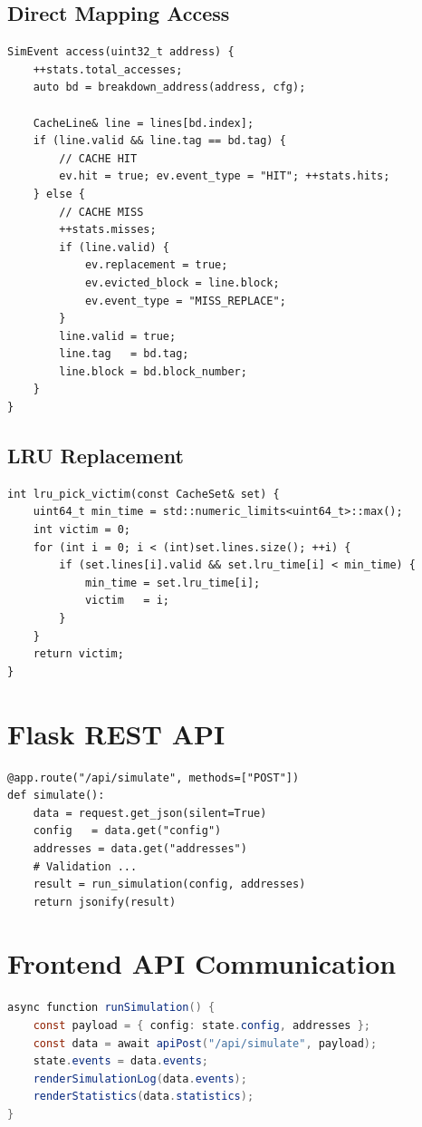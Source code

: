 \documentclass[12pt,a4paper]{report}
\begin{document}
\subsection{Direct Mapping Access}
\begin{lstlisting}[style=cppstyle, caption=Direct mapping hit/miss detection]
SimEvent access(uint32_t address) {
    ++stats.total_accesses;
    auto bd = breakdown_address(address, cfg);

    CacheLine& line = lines[bd.index];
    if (line.valid && line.tag == bd.tag) {
        // CACHE HIT
        ev.hit = true; ev.event_type = "HIT"; ++stats.hits;
    } else {
        // CACHE MISS
        ++stats.misses;
        if (line.valid) {
            ev.replacement = true;
            ev.evicted_block = line.block;
            ev.event_type = "MISS_REPLACE";
        }
        line.valid = true;
        line.tag   = bd.tag;
        line.block = bd.block_number;
    }
}
\end{lstlisting}

\subsection{LRU Replacement}
\begin{lstlisting}[style=cppstyle, caption=LRU victim selection]
int lru_pick_victim(const CacheSet& set) {
    uint64_t min_time = std::numeric_limits<uint64_t>::max();
    int victim = 0;
    for (int i = 0; i < (int)set.lines.size(); ++i) {
        if (set.lines[i].valid && set.lru_time[i] < min_time) {
            min_time = set.lru_time[i];
            victim   = i;
        }
    }
    return victim;
}
\end{lstlisting}

\section{Flask REST API}
\begin{lstlisting}[style=pystyle, caption=Simulate endpoint (app.py)]
@app.route("/api/simulate", methods=["POST"])
def simulate():
    data = request.get_json(silent=True)
    config   = data.get("config")
    addresses = data.get("addresses")
    # Validation ...
    result = run_simulation(config, addresses)
    return jsonify(result)
\end{lstlisting}

\section{Frontend API Communication}
\begin{lstlisting}[language=Java, caption=JavaScript simulation call (simulator.js)]
async function runSimulation() {
    const payload = { config: state.config, addresses };
    const data = await apiPost("/api/simulate", payload);
    state.events = data.events;
    renderSimulationLog(data.events);
    renderStatistics(data.statistics);
}
\end{lstlisting}
\end{document}
